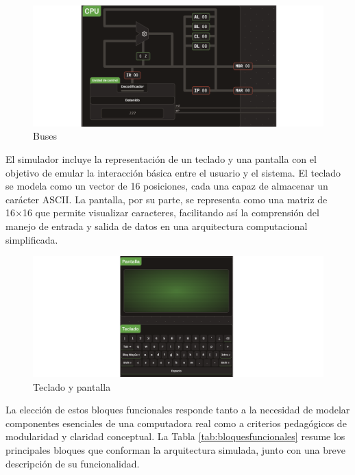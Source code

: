 \documentclass[12pt,oneside]{templates/unerthesis}
\begin{document}
\begin{figure}

{\centering \includegraphics[width=0.85\linewidth]{images/buses} 

}

\caption{Buses}\label{fig:buses}
\end{figure}

El simulador incluye la representación de un teclado y una pantalla con el objetivo de emular la interacción básica entre el usuario y el sistema. El teclado se modela como un vector de 16 posiciones, cada una capaz de almacenar un carácter ASCII. La pantalla, por su parte, se representa como una matriz de 16×16 que permite visualizar caracteres, facilitando así la comprensión del manejo de entrada y salida de datos en una arquitectura computacional simplificada.

\begin{figure}

{\centering \includegraphics[width=0.85\linewidth]{images/tecladopantalla} 

}

\caption{Teclado y pantalla}\label{fig:tecladopantalla}
\end{figure}

La elección de estos bloques funcionales responde tanto a la necesidad de modelar componentes esenciales de una computadora real como a criterios pedagógicos de modularidad y claridad conceptual. La Tabla \ref{tab:bloquesfuncionales} resume los principales bloques que conforman la arquitectura simulada, junto con una breve descripción de su funcionalidad.
\end{document}
